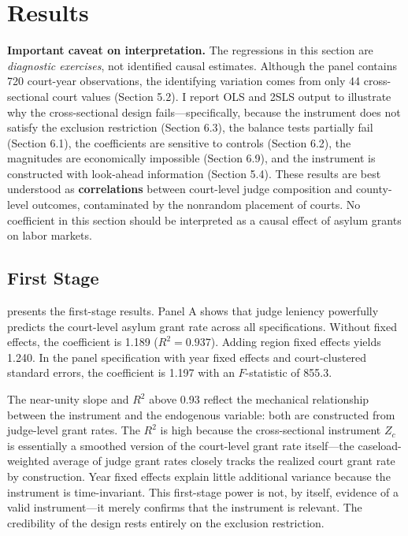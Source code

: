 \documentclass[12pt]{article}
\begin{document}
\section{Results}

\textbf{Important caveat on interpretation.} The regressions in this section are \textit{diagnostic exercises}, not identified causal estimates. Although the panel contains 720 court-year observations, the identifying variation comes from only 44 cross-sectional court values (Section 5.2). I report OLS and 2SLS output to illustrate why the cross-sectional design fails---specifically, because the instrument does not satisfy the exclusion restriction (Section 6.3), the balance tests partially fail (Section 6.1), the coefficients are sensitive to controls (Section 6.2), the magnitudes are economically impossible (Section 6.9), and the instrument is constructed with look-ahead information (Section 5.4). These results are best understood as \textbf{correlations} between court-level judge composition and county-level outcomes, contaminated by the nonrandom placement of courts. No coefficient in this section should be interpreted as a causal effect of asylum grants on labor markets.

\subsection{First Stage}



 presents the first-stage results. Panel A shows that judge leniency powerfully predicts the court-level asylum grant rate across all specifications. Without fixed effects, the coefficient is 1.189 ($R^2 = 0.937$). Adding region fixed effects yields 1.240. In the panel specification with year fixed effects and court-clustered standard errors, the coefficient is 1.197 with an $F$-statistic of 855.3.

The near-unity slope and $R^2$ above 0.93 reflect the mechanical relationship between the instrument and the endogenous variable: both are constructed from judge-level grant rates. The $R^2$ is high because the cross-sectional instrument $Z_c$ is essentially a smoothed version of the court-level grant rate itself---the caseload-weighted average of judge grant rates closely tracks the realized court grant rate by construction. Year fixed effects explain little additional variance because the instrument is time-invariant. This first-stage power is not, by itself, evidence of a valid instrument---it merely confirms that the instrument is relevant. The credibility of the design rests entirely on the exclusion restriction.
\end{document}
